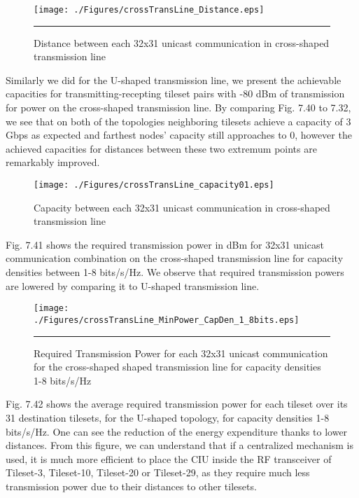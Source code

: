 \begin{figure}[H]
  \centering
    \texttt{[image: ./Figures/crossTransLine\_Distance.eps]}
    \rule{35em}{0.5pt}
  \caption[Distance between each 32x31 unicast communication in cross-shaped transmission line]{Distance between each 32x31 unicast communication in cross-shaped transmission line}
  \label{fig:Electron}
\end{figure}

Similarly we did for the U-shaped transmission line, we present the achievable capacities for transmitting-recepting tileset pairs with -80 dBm of transmission for power on the cross-shaped transmission line. By comparing Fig. 7.40 to 7.32, we see that on both of the topologies neighboring tilesets achieve a capacity of 3 Gbps as expected and farthest nodes' capacity still approaches to 0, however the achieved capacities for distances between these two extremum points are remarkably improved.

\begin{figure}[H]
  \centering
    \texttt{[image: ./Figures/crossTransLine\_capacity01.eps]}
  \caption[Capacity between each 32x31 unicast communication in cross-shaped transmission line]{Capacity between each 32x31 unicast communication in cross-shaped transmission line}
  \label{fig:Electron}
\end{figure}

Fig. 7.41 shows the required transmission power in dBm for 32x31 unicast communication combination on the cross-shaped transmission line for capacity densities between 1-8 bits/s/Hz. We observe that required transmission powers are lowered by comparing it to U-shaped transmission line. 

\begin{figure}[H]
  \centering
    \texttt{[image: ./Figures/crossTransLine\_MinPower\_CapDen\_1\_8bits.eps]}
    \rule{35em}{0.5pt}
  \caption[Required Transmission Power for each 32x31 unicast communication for the cross-shaped shaped transmission line for capacity densities 1-8 bits/s/Hz]{Required Transmission Power for each 32x31 unicast communication for the cross-shaped shaped transmission line for capacity densities 1-8 bits/s/Hz}
  \label{fig:Electron}
\end{figure}


Fig. 7.42 shows the average required transmission power for each tileset over its 31 destination tilesets, for the U-shaped topology, for capacity densities 1-8 bits/s/Hz. One can see the reduction of the energy expenditure thanks to lower distances. From this figure, we can understand that if a centralized mechanism is used, it is much more efficient to place the CIU inside the RF transceiver of Tileset-3, Tileset-10, Tileset-20 or Tileset-29, as they require much less transmission power due to their distances to other tilesets. 
 
